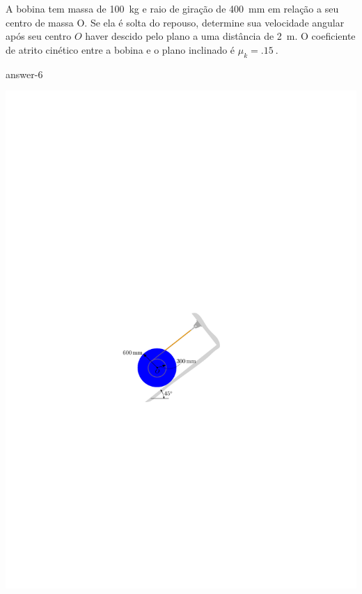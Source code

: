 \item A bobina tem massa de \SI{100}{\kilogram} e raio de giração de \SI{400}{\milli\meter} em relação a seu centro de massa O. Se ela é solta do repouso, determine sua velocidade angular após seu centro $O$ haver descido pelo plano a uma distância de \SI{2}{\meter}. O coeficiente de atrito cinético entre a bobina e o plano inclinado é $\mu_{k}=\SI{.15}{}$.

{answer-6}

\vspace{-1cm}
\begin{flushright}
	\includegraphics[scale=1.3]{../../images/draw_3_1}
\end{flushright}